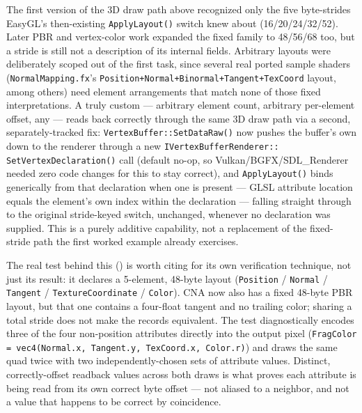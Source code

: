 The first version of the 3D draw path above recognized only the five byte-strides EasyGL's
then-existing \texttt{ApplyLayout()} switch knew about (16/20/24/32/52). Later PBR and
vertex-color work expanded the fixed family to 48/56/68 too, but a stride is still not a
description of its internal fields. Arbitrary layouts were deliberately scoped out of the
first task, since several real ported sample shaders
(\texttt{NormalMapping.fx}'s \texttt{Position+Normal+Binormal+Tangent+TexCoord} layout,
among others) need element arrangements that match none of those fixed interpretations. A
truly custom  --- arbitrary element count, arbitrary per-element
offset, any  --- reads back correctly through the same 3D
 draw path via a second, separately-tracked fix:
\texttt{VertexBuffer::SetDataRaw()}
now pushes the buffer's own  down to the renderer through a new
\texttt{IVertexBuffer}\allowbreak{}\texttt{Renderer::}\allowbreak{}%
\texttt{SetVertexDeclaration()} call (default no-op, so
Vulkan/BGFX/SDL\_Renderer needed zero code changes for this to stay correct), and
\texttt{ApplyLayout()} binds
generically from that declaration when one is present --- GLSL attribute location equals
the element's own index within the declaration --- falling straight through to the
original stride-keyed switch, unchanged, whenever no declaration was supplied. This is a
purely additive capability, not a replacement of the fixed-stride path the first worked
example already exercises.

The real test behind this ()
is worth citing for its own verification technique, not just its result: it declares a
5-element, 48-byte layout (\texttt{Position} / \texttt{Normal} / \texttt{Tangent} / %
\texttt{TextureCoordinate} / \texttt{Color}). CNA now also has a fixed 48-byte PBR layout,
but that one contains a four-float tangent and no trailing color; sharing a total stride does
not make the records equivalent. The test diagnostically encodes three of the four
non-position attributes directly into the output pixel
(\texttt{FragColor = vec4(Normal.x, Tangent.y, TexCoord.x, Color.r)}) and draws the same
quad twice with two independently-chosen sets of attribute values. Distinct, correctly-offset
readback values across both draws is what proves each attribute is being read from its own
correct byte offset --- not aliased to a neighbor, and not a value that happens to be
correct by coincidence.

